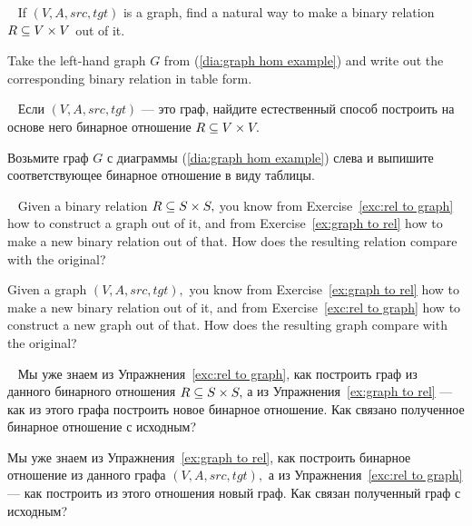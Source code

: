 \documentclass[../main/CT4S-EN-RU]{subfiles}
\begin{document}
\begin{exerciseENG}\label{ex:graph to rel}~
\sexc If $(V,A,src,tgt)$ is a graph, find a natural way to make a binary relation $R\ss V\times V$ out of it. 
\item Take the left-hand graph $G$ from (\ref{dia:graph hom example}) and write out the corresponding binary relation in table form.
\endsexc
\end{exerciseENG}

\begin{exerciseRUS}\label{ex:graph to rel}~
\sexc Если $(V,A,src,tgt)$ — это граф, найдите естественный способ построить на основе него бинарное отношение $R\ss V\times V.$ 
\item Возьмите граф $G$ с диаграммы (\ref{dia:graph hom example}) слева и выпишите соответствующее бинарное отношение в виду таблицы.
\endsexc
\end{exerciseRUS}

\begin{exerciseENG}~
\sexc Given a binary relation $R\ss S\times S,$ you know from Exercise~\ref{exc:rel to graph} how to construct a graph out of it, and from Exercise~\ref{ex:graph to rel} how to make a new binary relation out of that. How does the resulting relation compare with the original?
\item Given a graph $(V,A,src,tgt),$ you know from Exercise~\ref{ex:graph to rel} how to make a new binary relation out of it, and from Exercise~\ref{exc:rel to graph} how to construct a new graph out of that. How does the resulting graph compare with the original? 
\endsexc
\end{exerciseENG}

\begin{exerciseRUS}~
\sexc Мы уже знаем из Упражнения~\ref{exc:rel to graph}, как построить граф из данного бинарного отношения $R\ss S\times S,$ а из Упражнения~\ref{ex:graph to rel} — как из этого графа построить новое бинарное отношение. Как связано полученное бинарное отношение с исходным?
\item Мы уже знаем из Упражнения~\ref{ex:graph to rel}, как построить бинарное отношение из данного графа $(V,A,src,tgt),$ а из Упражнения~\ref{exc:rel to graph} — как построить из этого отношения новый граф. Как связан полученный граф с исходным? 
\endsexc
\end{exerciseRUS}
\end{document}
